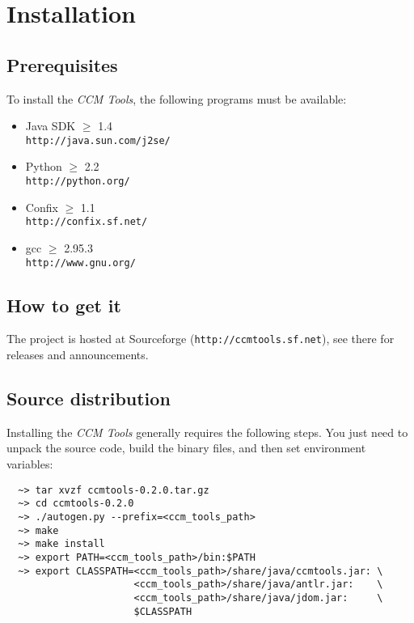 
\chapter{Installation}

\section{Prerequisites}

To install the {\it CCM Tools}, the following programs must be available:
\begin{itemize}
\item Java SDK $\ge$ 1.4 \\
{\tt http://java.sun.com/j2se/}
\item Python $\ge$ 2.2 \\
{\tt http://python.org/}
\item Confix $\ge$ 1.1 \\
{\tt http://confix.sf.net/}
\item gcc $\ge$ 2.95.3 \\
{\tt http://www.gnu.org/}
\end{itemize}

\section{How to get it}

The project is hosted at Sourceforge ({\tt http://ccmtools.sf.net}), see there
for releases and announcements.


\section{Source distribution}

Installing the {\it CCM Tools} generally requires the following steps. You just
need to unpack the source code, build the binary files, and then set environment
variables:
\begin{verbatim}
  ~> tar xvzf ccmtools-0.2.0.tar.gz
  ~> cd ccmtools-0.2.0
  ~> ./autogen.py --prefix=<ccm_tools_path>
  ~> make
  ~> make install
  ~> export PATH=<ccm_tools_path>/bin:$PATH
  ~> export CLASSPATH=<ccm_tools_path>/share/java/ccmtools.jar: \
                      <ccm_tools_path>/share/java/antlr.jar:    \
                      <ccm_tools_path>/share/java/jdom.jar:     \
                      $CLASSPATH
\end{verbatim}

